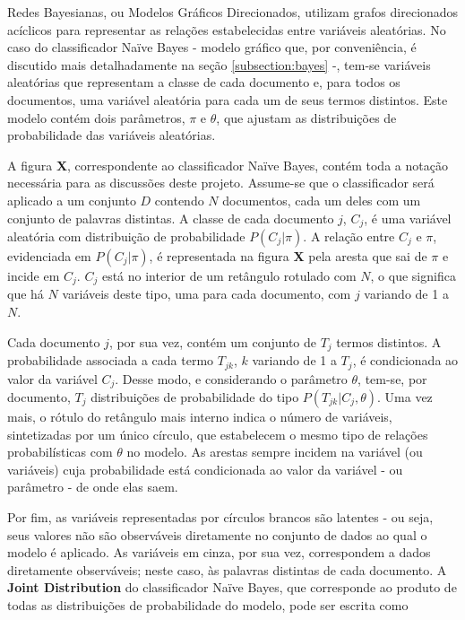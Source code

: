 Redes Bayesianas, ou Modelos Gráficos Direcionados, utilizam grafos direcionados acíclicos para representar as relações estabelecidas entre variáveis aleatórias. No caso do classificador Naïve Bayes - modelo gráfico que, por conveniência, é discutido mais detalhadamente na seção \ref{subsection:bayes} -, tem-se variáveis aleatórias que representam a classe de cada documento e, para todos os documentos, uma variável aleatória para cada um de seus termos distintos. Este modelo contém dois parâmetros, \ensuremath{\pi} e \ensuremath{\theta}, que ajustam as distribuições de probabilidade das variáveis aleatórias. 

A figura \textbf{X}, correspondente ao classificador Naïve Bayes, contém toda a notação necessária para as discussões deste projeto. Assume-se que o classificador será aplicado a um conjunto \ensuremath{D} contendo \ensuremath{N} documentos, cada um deles com um conjunto de palavras distintas. A classe de cada documento \ensuremath{j}, \ensuremath{C_j}, é uma variável aleatória com distribuição de probabilidade \ensuremath{P(C_j|\pi)}. A relação entre \ensuremath{C_j} e \ensuremath{\pi}, evidenciada em \ensuremath{P(C_j|\pi)}, é representada na figura \textbf{X} pela aresta que sai de \ensuremath{\pi} e incide em \ensuremath{C_j}. \ensuremath{C_j} está no interior de um retângulo rotulado com \ensuremath{N}, o que significa que há \ensuremath{N} variáveis deste tipo, uma para cada documento, com \ensuremath{j} variando de 1 a \ensuremath{N}. 

Cada documento \ensuremath{j}, por sua vez, contém um conjunto de \ensuremath{T_j} termos distintos. A probabilidade associada a cada termo \ensuremath{T_{jk}}, \ensuremath{k} variando de 1 a \ensuremath{T_j}, é condicionada ao valor da variável \ensuremath{C_j}. Desse modo, e considerando o parâmetro \ensuremath{\theta}, tem-se, por documento, \ensuremath{T_j} distribuições de probabilidade do tipo \ensuremath{P(T_{jk}|C_j, \theta)}. Uma vez mais, o rótulo do retângulo mais interno indica o número de variáveis, sintetizadas por um único círculo, que estabelecem o mesmo tipo de relações probabilísticas com \ensuremath{\theta} no modelo. As arestas sempre incidem na variável (ou variáveis) cuja probabilidade está condicionada ao valor da variável - ou parâmetro - de onde elas saem.

Por fim, as variáveis representadas por círculos brancos são latentes - ou seja, seus valores não são observáveis diretamente no conjunto de dados ao qual o modelo é aplicado. As variáveis em cinza, por sua vez, correspondem a dados diretamente observáveis; neste caso, às palavras distintas de cada documento. A \textbf{Joint Distribution} do classificador Naïve Bayes, que corresponde ao produto de todas as distribuições de probabilidade do modelo, pode ser escrita como 

